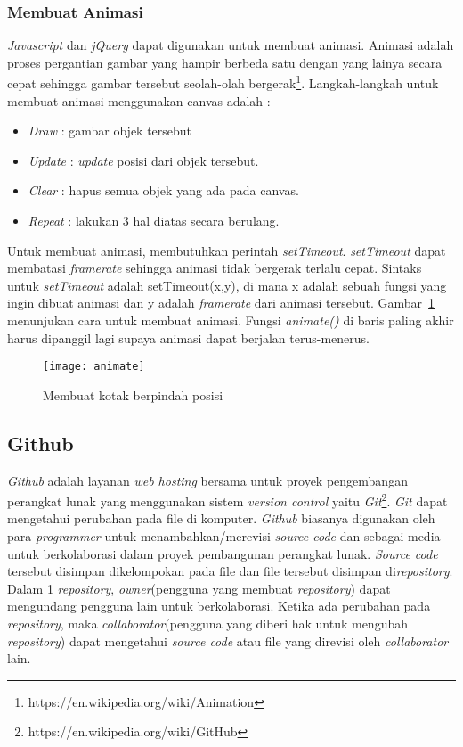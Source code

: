 \subsubsection{Membuat Animasi}
\textit{Javascript} dan \textit{jQuery} dapat digunakan untuk membuat animasi. Animasi adalah proses pergantian gambar yang hampir berbeda satu dengan yang lainya secara cepat sehingga gambar tersebut seolah-olah bergerak\footnote{https://en.wikipedia.org/wiki/Animation}. Langkah-langkah untuk membuat animasi menggunakan canvas adalah :

\begin{itemize}
	\item \textit{Draw} : gambar objek tersebut
	\item \textit{Update} : \textit{update} posisi dari objek tersebut.
	\item \textit{Clear} : hapus semua objek yang ada pada canvas.
	\item \textit{Repeat} : lakukan 3 hal diatas secara berulang.
\end{itemize}

Untuk membuat animasi, membutuhkan perintah \textit{setTimeout}. \textit{setTimeout} dapat membatasi \textit{framerate} sehingga animasi tidak bergerak terlalu cepat. Sintaks untuk \textit{setTimeout} adalah setTimeout(x,y), di mana x adalah sebuah fungsi yang ingin dibuat animasi dan y adalah \textit{framerate} dari animasi tersebut. Gambar~\ref{fig:animate} menunjukan cara untuk membuat animasi. Fungsi \textit{animate()} di baris paling akhir harus dipanggil lagi supaya animasi dapat berjalan terus-menerus.

\begin{figure}[H]
	\centering  
	\texttt{[image: animate]}
	\caption[Membuat kotak berpindah posisi]{Membuat kotak berpindah posisi}
	\label{fig:animate} 
\end{figure} 

\subsection{Github}
\textit{Github} adalah layanan \textit{web hosting} bersama untuk proyek pengembangan perangkat lunak yang menggunakan sistem \textit{version control} yaitu \textit{Git}\footnote{https://en.wikipedia.org/wiki/GitHub}. \textit{Git} dapat mengetahui perubahan pada file di komputer. \textit{Github} biasanya digunakan oleh para \textit{programmer} untuk menambahkan/merevisi \textit{source code} dan sebagai media untuk berkolaborasi dalam proyek pembangunan perangkat lunak. \textit{Source code} tersebut disimpan dikelompokan pada file dan file tersebut disimpan di\textit{repository}. Dalam 1 \textit{repository}, \textit{owner}(pengguna yang membuat \textit{repository}) dapat mengundang pengguna lain untuk berkolaborasi. Ketika ada perubahan pada \textit{repository}, maka \textit{collaborator}(pengguna yang diberi hak untuk mengubah \textit{repository}) dapat mengetahui \textit{source code} atau file yang direvisi oleh \textit{collaborator} lain.\\

